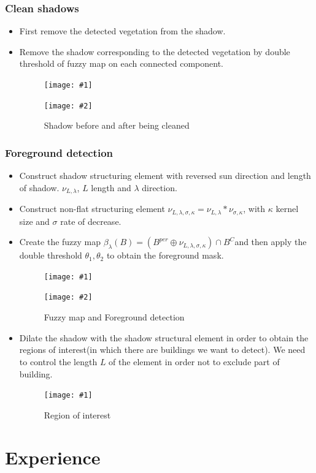 \documentclass[compress]{beamer} %
\newcommand{\insertTwoF}[4]{
  \begin{figure}[h!]
    \centering
    \begin{minipage}{#4\linewidth}
    \texttt{[image: \#1]}
    \end{minipage}
    \begin{minipage}{#4\linewidth}
    \texttt{[image: \#2]}
    \end{minipage}
      \caption{#3}
  \end{figure}  
}
\newcommand{\insertF}[3]{
  \begin{figure}[h!]
    \centering
    \begin{minipage}{#3\linewidth}
    \texttt{[image: \#1]}
    \end{minipage}  
      \caption{#2}
  \end{figure}  
}
\begin{document}
 
\begin{frame}
  \frametitle{Clean shadows}
  \begin{itemize}
   \item First remove the detected vegetation from the shadow.
   \item Remove the shadow corresponding to the detected vegetation by double threshold of fuzzy map on each connected component. 
   \insertTwoF{shadow}{cleaned_shadow}{Shadow before and after being cleaned}{0.4}
  \end{itemize}
 \end{frame} 
 
 
\begin{frame}
  \frametitle{Foreground detection}
    
  \begin{itemize}
   \item Construct shadow structuring element with reversed sun direction and length of shadow. $\nu_{L,\lambda}$, $L$ length and $\lambda$ direction. 
   \item Construct non-flat structuring element $\nu_{L,\lambda,\sigma,\kappa}=\nu_{L,\lambda}*\nu_{\sigma,\kappa}$, with $\kappa$ kernel size and $\sigma$ rate of decrease.
   \item Create the fuzzy map $\beta_{\lambda}(B)=(B^{per}\oplus \nu_{L,\lambda,\sigma,\kappa})\cap B^C$and then apply the double threshold $\theta_1, \theta_2$ to obtain the foreground mask.
   \insertTwoF{fuzzy_map}{fore-back}{Fuzzy map and Foreground detection}{0.4}
  \end{itemize}
 \end{frame} 
 
 
\begin{frame}
\begin{itemize}
  \frametitle{ROI detection}
   \item Dilate the shadow with the shadow structural element in order to obtain the regions of interest(in which there are buildings we want to detect). We need to control the length $L$ of the element in order not to exclude part of building.
   \insertF{ROI}{Region of interest}{0.8}
  \end{itemize}
 \end{frame} 
 
 
 \section{Experience}
 
\end{document}
